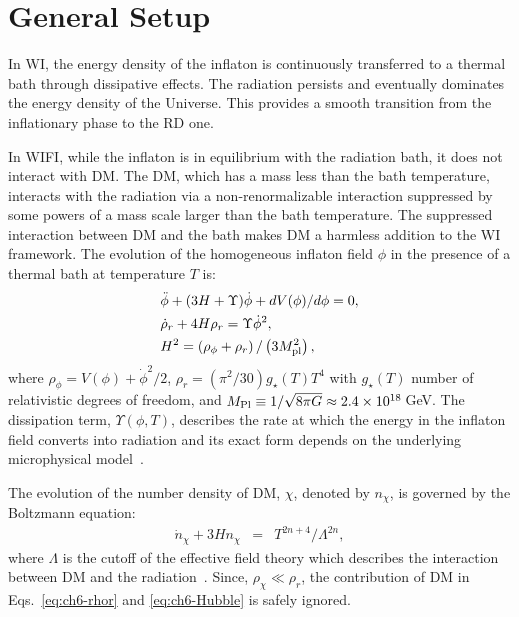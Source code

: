 \section{General Setup}
\label{sec:ch6-model}

In WI, the energy density of the inflaton is continuously transferred to a thermal bath through dissipative effects.  The radiation persists and eventually dominates the energy density of the Universe. This provides a smooth transition from the inflationary phase to the RD one.

In WIFI, while the inflaton
is in equilibrium with the radiation bath, it does not interact with DM. The DM, which has a mass less than the bath temperature, interacts with the radiation via a non-renormalizable interaction suppressed by some powers of a mass scale larger than the bath temperature. The suppressed interaction between DM and the bath makes DM a harmless addition to the WI framework. The evolution of the homogeneous inflaton
field $\phi$ in the presence of a thermal bath at temperature $T$ is:
\begin{align}
    &\ddot{\phi}+(3H+\Upsilon)\dot{\phi}+dV(\phi)/d\phi=0,\label{eq:ch6-inflaton} \\
    & \dot{\rho}_r+4H\rho_r=\Upsilon \dot{\phi}^2,\label{eq:ch6-rhor} \\
    & H^2=\left(\rho_\phi+\rho_r\right)/\left(3 M_{\rm{pl}}^2\right),\label{eq:ch6-Hubble}
\end{align}
where $\rho_\phi=V(\phi)+\dot{\phi}^2/2$, $\rho_r=(\pi^2/30)g_\star(T)T^4$ with $g_\star(T)$ number of relativistic degrees of freedom, and $M_{\rm{Pl}}\equiv 1/\sqrt{8\pi G}\approx 2.4 \times 10^{18}\,$GeV.
 The dissipation term, $\Upsilon(\phi,T)$, describes the rate at which the energy in the inflaton field converts into radiation and its exact form depends on the underlying microphysical model~\cite{Berera:1998px}.

The evolution of the number density of DM, $\chi$, denoted by $n_\chi$, is governed by the Boltzmann equation:
\begin{eqnarray}
    \dot{n}_\chi+3H n_\chi&=&T^{2n+4}/\Lambda^{2n},\label{eq:ch6-nchi}
\end{eqnarray}
where $\Lambda$ is the cutoff of the effective field theory which describes the interaction between DM and the radiation~\cite{Elahi:2014fsa}. Since, $\rho_\chi\ll \rho_r$, the contribution of DM in Eqs.~\eqref{eq:ch6-rhor} and \eqref{eq:ch6-Hubble} is safely ignored.

